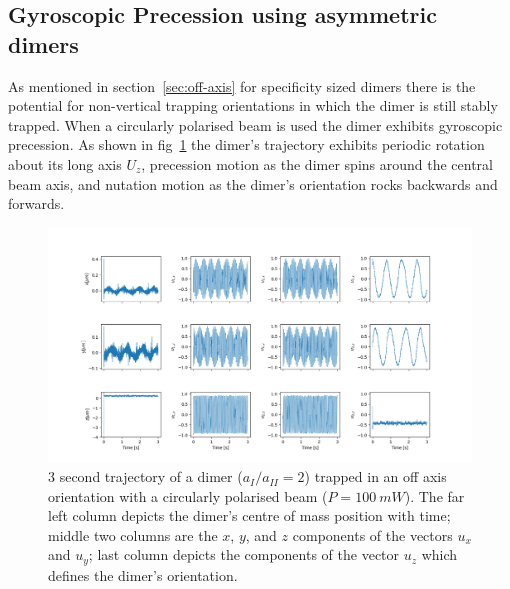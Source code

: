 \subsection{Gyroscopic Precession using asymmetric dimers}
As mentioned in section~\ref{sec:off-axis} for specificity sized dimers there 
is the potential for non-vertical trapping orientations in which the dimer is 
still stably trapped. When a circularly polarised beam is used the dimer exhibits gyroscopic precession. As shown in fig~\ref{fig:gyro} the dimer's trajectory
exhibits periodic rotation about its long axis $U_z$, precession motion as the
dimer spins around the central beam axis, and nutation motion as the dimer's
orientation rocks backwards and forwards. 
\begin{figure}[h]
	\centering
	\includegraphics[width=\linewidth]{gyroscopic_precession.png}
	\caption{3 second trajectory of a dimer ($a_{I}/a_{II}=2$) trapped in an 
		off axis orientation with a circularly polarised beam ($P= 100\ mW$). 
		The far left column depicts the dimer's centre of mass position with 
		time; middle two columns are the $x$, $y$, and $z$ components of the 
		vectors $u_x$ and $u_y$; last column depicts the components of the 
		vector $u_z$ which defines the dimer's orientation.}
	\label{fig:gyro}
\end{figure}

